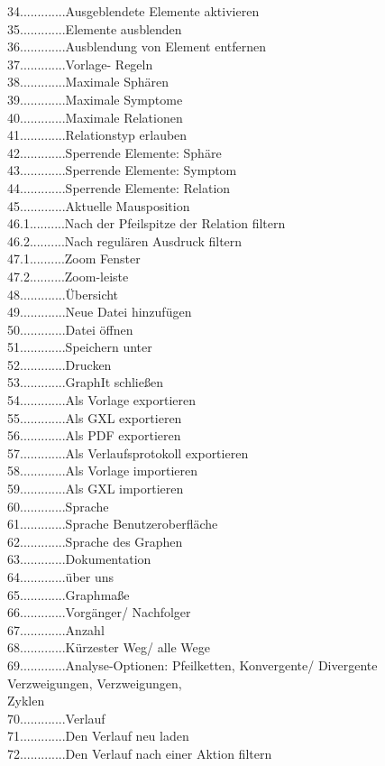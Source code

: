 \documentclass[enabledeprecatedfontcommands,fontsize=11pt,paper=a4,twoside]{scrartcl}
\newcounter{one}
\newcommand*{\hdo}{.............}
\begin{document}
34\hdo Ausgeblendete Elemente aktivieren\\
35\hdo Elemente ausblenden\\
36\hdo Ausblendung von Element entfernen\\
37\hdo  Vorlage- Regeln\\
38\hdo  Maximale Sphären\\
39\hdo  Maximale Symptome\\
40\hdo  Maximale Relationen\\
41\hdo  Relationstyp erlauben\\
42\hdo  Sperrende Elemente: Sphäre\\
43\hdo  Sperrende Elemente: Symptom\\
44\hdo  Sperrende Elemente: Relation\\
45\hdo Aktuelle Mausposition \\
46.1..........Nach der Pfeilspitze der Relation filtern \\
46.2..........Nach regulären Ausdruck filtern\\
47.1..........Zoom Fenster  \\
47.2..........Zoom-leiste \\
48\hdo  Übersicht \\
49\hdo Neue Datei hinzufügen\\
50\hdo Datei öffnen\\
51\hdo Speichern unter\\
52\hdo Drucken\\
53\hdo GraphIt schließen\\
54\hdo Als Vorlage exportieren\\
55\hdo Als GXL exportieren\\
56\hdo Als PDF exportieren\\
57\hdo Als Verlaufsprotokoll exportieren\\
58\hdo Als Vorlage importieren\\
59\hdo Als GXL importieren\\
60\hdo Sprache\\
61\hdo Sprache Benutzeroberfläche\\
62\hdo Sprache des Graphen\\
63\hdo Dokumentation\\
64\hdo über uns \\
65\hdo Graphmaße\\
66\hdo Vorgänger/ Nachfolger\\
67\hdo Anzahl\\
68\hdo Kürzester Weg/ alle Wege\\
69\hdo Analyse-Optionen: Pfeilketten, Konvergente/ Divergente Verzweigungen, Verzweigungen,\\ 		
\hspace*{1.7cm} Zyklen\\
70\hdo Verlauf\\
71\hdo Den Verlauf neu laden\\
72\hdo Den Verlauf nach einer Aktion filtern\\ 
\end{document}
